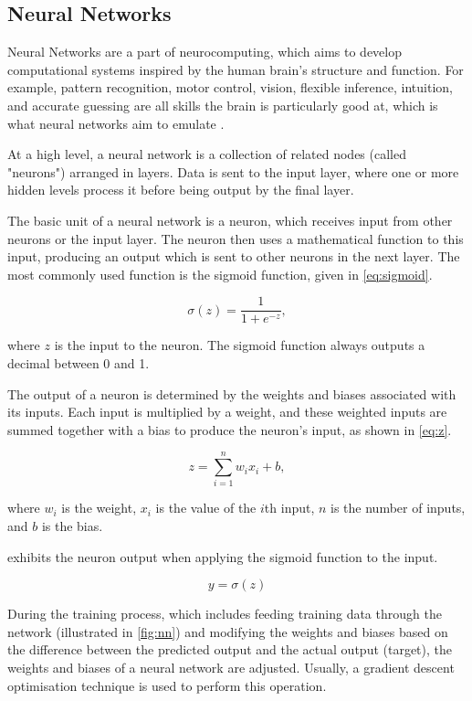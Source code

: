 \subsection{Neural Networks}\label{neuralnet}
Neural Networks are a part of neurocomputing, which aims to develop computational systems inspired by the human brain's structure and function. For example, pattern recognition, motor control, vision, flexible inference, intuition, and accurate guessing are all skills the brain is particularly good at, which is what neural networks aim to emulate \autocite{anderson1995introduction}. 

At a high level, a neural network is a collection of related nodes (called "neurons") arranged in layers. Data is sent to the input layer, where one or more hidden levels process it before being output by the final layer.

The basic unit of a neural network is a neuron, which receives input from other neurons or the input layer. The neuron then uses a mathematical function to this input, producing an output which is sent to other neurons in the next layer. The most commonly used function is the sigmoid function, given in \cref{eq:sigmoid}. 

\begin{equation}
    \sigma(z) = \frac{1}{1+e^{-z}}, 
    \label{eq:sigmoid}
\end{equation}

where $z$ is the input to the neuron. The sigmoid function always outputs a decimal between 0 and 1. 

The output of a neuron is determined by the weights and biases associated with its inputs. Each input is multiplied by a weight, and these weighted inputs are summed together with a bias to produce the neuron's input, as shown in \cref{eq:z}. 

\begin{equation}
    z = \sum_{i=1}^n w_i x_i + b, 
    \label{eq:z}
\end{equation}

where $w_i$ is the weight, $x_i$ is the value of the $i$th input, $n$ is the number of inputs, and $b$ is the bias. 

 exhibits the neuron output when applying the sigmoid function to the input.

\begin{equation}
    y = \sigma(z)
    \label{eq:y}
\end{equation}

During the training process, which includes feeding training data through the network (illustrated in \cref{fig:nn}) and modifying the weights and biases based on the difference between the predicted output and the actual output (target), the weights and biases of a neural network are adjusted. Usually, a gradient descent optimisation technique is used to perform this operation.

